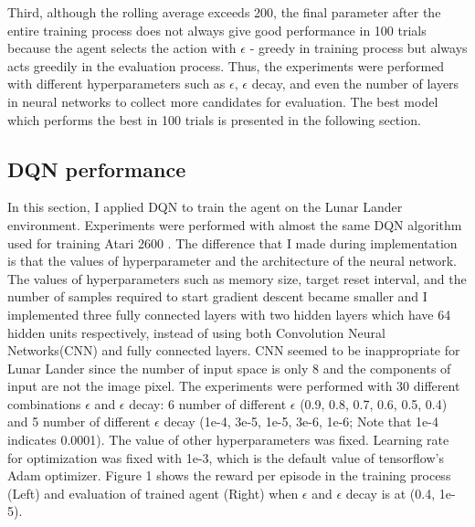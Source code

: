 \documentclass{article}
\begin{document}
Third, although the rolling average exceeds 200, the final parameter after the entire training process does not always give good performance in 100 trials because the agent selects the action with $\epsilon$ - greedy in training process but always acts greedily in the evaluation process. Thus, the experiments were performed with different hyperparameters such as $\epsilon$, $\epsilon$ decay, and even the number of layers in neural networks to collect more candidates for evaluation. The best model which performs the best in 100 trials is presented in the following section. 

\subsection{DQN performance}
In this section, I applied DQN to train the agent on the Lunar Lander environment. Experiments were performed with almost the same DQN algorithm used for training Atari 2600 \cite{mnih2015human}. The difference that I made during implementation is that the values of hyperparameter and the architecture of the neural network. The values of hyperparameters such as memory size, target reset interval, and the number of samples required to start gradient descent became smaller and I implemented three fully connected layers with two hidden layers which have 64 hidden units respectively, instead of using both Convolution Neural Networks(CNN) and fully connected layers. CNN seemed to be inappropriate for Lunar Lander since the number of input space is only 8 and the components of input are not the image pixel. The experiments were performed with 30 different combinations $\epsilon$ and $\epsilon$ decay: 6 number of different $\epsilon$ (0.9, 0.8, 0.7, 0.6, 0.5, 0.4) and 5 number of different $\epsilon$ decay (1e-4, 3e-5, 1e-5, 3e-6, 1e-6; Note that 1e-4 indicates 0.0001). The value of other hyperparameters was fixed. Learning rate for optimization was fixed with 1e-3, which is the default value of tensorflow's Adam optimizer. Figure 1 shows the reward per episode in the training process (Left) and evaluation of trained agent (Right) when  $\epsilon$ and  $\epsilon$ decay is at (0.4, 1e-5). 
\end{document}

